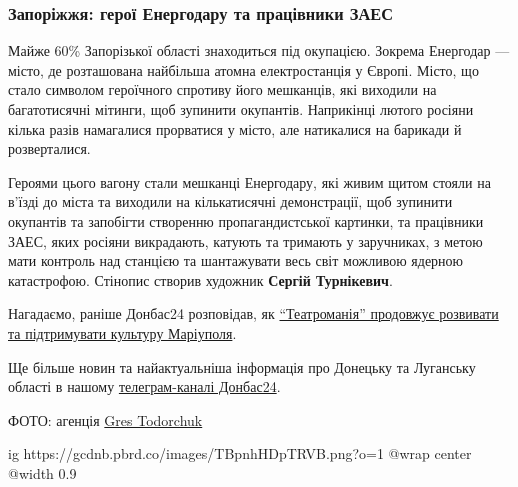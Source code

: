 \subsubsection{Запоріжжя: герої Енергодару та працівники ЗАЕС}

Майже 60\% Запорізької області знаходиться під окупацією. Зокрема Енергодар —
місто, де розташована найбільша атомна електростанція у Європі. Місто, що стало
символом героїчного спротиву його мешканців, які виходили на багатотисячні
мітинги, щоб зупинити окупантів. Наприкінці лютого росіяни кілька разів
намагалися прорватися у місто, але натикалися на барикади й розверталися.


Героями цього вагону стали мешканці Енергодару, які живим щитом стояли на
в'їзді до міста та виходили на кількатисячні демонстрації, щоб зупинити
окупантів та запобігти створенню пропагандистської картинки, та працівники
ЗАЕС, яких росіяни викрадають, катують та тримають у заручниках, з метою мати
контроль над станцією та шантажувати весь світ можливою ядерною катастрофою.
Стінопис створив художник \textbf{Сергій Турнікевич}.

Нагадаємо, раніше Донбас24 розповідав, як \href{https://donbas24.news/news/teatromaniya-prodovzuje-rozvivati-ta-pidtrimuvati-kulturu-mariupolya}{\enquote{Театроманія} продовжує розвивати та
підтримувати культуру Маріуполя}.

Ще більше новин та найактуальніша інформація про Донецьку та Луганську області
в нашому \href{https://t.me/donbas24/}{телеграм-каналі Донбас24}.

ФОТО: агенція \href{https://www.facebook.com/grestodorchuk/}{Gres Todorchuk}

\ifcmt
  ig https://gcdnb.pbrd.co/images/TBpnhHDpTRVB.png?o=1
  @wrap center
  @width 0.9
\fi

